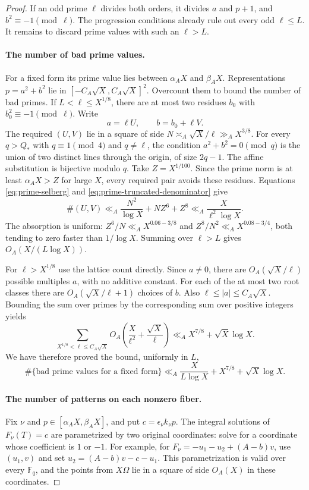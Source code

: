 \documentclass[11pt]{article}
\theoremstyle{definition}
\theoremstyle{remark}
\begin{document}
\begin{proof}
If an odd prime $\ell$ divides both orders, it divides $a$ and
$p+1$, and $b^2\equiv-1\pmod\ell$. The progression conditions
already rule out every odd $\ell\le L$. It remains to discard
prime values with such an $\ell>L$.

\paragraph{The number of bad prime values.}
For a fixed form its prime value lies between $\alpha_A X$ and
$\beta_A X$. Representations $p=a^2+b^2$ lie in
$[-C_A\sqrt X,C_A\sqrt X]^2$. Overcount them to bound the
number of bad primes. If $L<\ell\le X^{1/8}$, there are at most
two residues $b_0$ with $b_0^2\equiv-1\pmod\ell$. Write
\[
 a=\ell U,\qquad b=b_0+\ell V.
\]
The required $(U,V)$ lie in a square of side
$N\asymp_A\sqrt X/\ell\gg_A X^{3/8}$.
For every $q>Q_*$ with $q\equiv1\pmod4$ and $q\ne\ell$,
the condition $a^2+b^2=0\pmod q$ is the union of two distinct
lines through the origin, of size $2q-1$. The affine substitution
is bijective modulo $q$. Take $Z=X^{1/100}$. Since the prime norm
is at least $\alpha_A X>Z$ for large $X$, every required pair
avoids these residues. Equations \eqref{eq:prime-selberg} and
\eqref{eq:prime-truncated-denominator} give
\[
 \#(U,V)\ll_A \frac{N^2}{\log X}+NZ^6+Z^8
 \ll_A\frac{X}{\ell^2\log X}.
\]
The absorption is uniform: $Z^6/N\ll_A X^{0.06-3/8}$ and
$Z^8/N^2\ll_A X^{0.08-3/4}$, both tending to zero faster
than $1/\log X$. Summing over $\ell>L$ gives
$O_A(X/(L\log X))$.

For $\ell>X^{1/8}$ use the lattice count directly. Since
$a\ne0$, there are $O_A(\sqrt X/\ell)$ possible multiples $a$,
with no additive constant. For each of the at most two root
classes there are $O_A(\sqrt X/\ell+1)$ choices of $b$.
Also $\ell\le|a|\le C_A\sqrt X$. Bounding the sum over primes
by the corresponding sum over positive integers yields
\[
 \sum_{X^{1/8}<\ell\le C_A\sqrt X}
       O_A\left(\frac{X}{\ell^2}+\frac{\sqrt X}{\ell}\right)
 \ll_A X^{7/8}+\sqrt X\log X.
\]
We have therefore proved the bound, uniformly in $L$,
\begin{equation}\label{eq:prime-bad-values}
 \#\{\text{bad prime values for a fixed form}\}
 \ll_A\frac{X}{L\log X}+X^{7/8}+\sqrt X\log X.
\end{equation}

\paragraph{The number of patterns on each nonzero fiber.}
Fix $\nu$ and $p\in[\alpha_A X,\beta_A X]$, and put
$c=\epsilon_\nu k_\nu p$. The integral solutions of $F_\nu(T)=c$
are parametrized by two original coordinates: solve for a
coordinate whose coefficient is $1$ or $-1$. For example, for
$F_\nu=-u_1-u_2+(A-b)v$, use $(u_1,v)$ and set
$u_2=(A-b)v-c-u_1$. This parametrization is valid over every
$\mathbb F_q$, and the points from $X\Omega$ lie in a square
of side $O_A(X)$ in these coordinates.


\end{proof}
\end{document}
